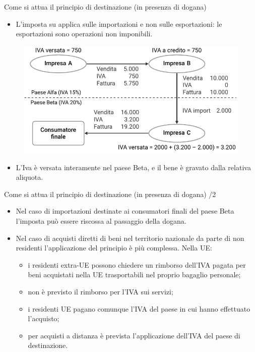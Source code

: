 \documentclass[aspectratio=149,11pt,italian]{beamer}
\begin{document}
\begin{frame}{Come si attua il principio di destinazione (in presenza di dogana)}

  \begin{itemize}
  \item L'imposta su applica sulle importazioni e non sulle esportazioni: le
    esportazioni sono operazioni \alert{non imponibili}.
  \end{itemize}

  \begin{figure}\centering
    \includegraphics[width=.8\textwidth]{./figure/IVA-destinazione.pdf}
  \end{figure}

  \begin{itemize}
  \item L'Iva è versata interamente nel paese Beta, e il bene è gravato dalla
    relativa aliquota.
  \end{itemize}
\end{frame}

\begin{frame}{Come si attua il principio di destinazione (in presenza di dogana) /2}

  \begin{itemize}
  \item Nel caso di \alert{importazioni destinate ai consumatori finali} del paese
    Beta l'imposta può essere riscossa al passaggio della dogana.
  \item Nel caso di \alert{acquisti diretti} di beni nel territorio nazionale da parte
    di non residenti l'applicazione del principio è più complessa. Nella UE:
    \begin{itemize}
    \item i residenti extra-UE possono chiedere un rimborso dell'IVA pagata
      per beni acquistati nella UE trasportabili nel proprio bagaglio
      personale;
    \item non è previsto il rimborso per l'IVA sui servizi;
    \item i residenti UE pagano comunque l'IVA del paese in cui hanno
      effettuato l'acquisto;
    \item per acquisti a distanza è prevista l'applicazione dell'IVA del paese
      di destinazione.
\end{itemize}
\end{itemize}
\end{frame}
\end{document}
